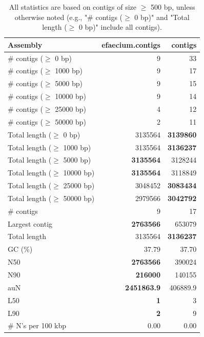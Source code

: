 \documentclass[12pt,a4paper]{article}
\begin{document}
\begin{table}[ht]
\begin{center}
\caption{All statistics are based on contigs of size $\geq$ 500 bp, unless otherwise noted (e.g., "\# contigs ($\geq$ 0 bp)" and "Total length ($\geq$ 0 bp)" include all contigs).}
\begin{tabular}{|l*{2}{|r}|}
\hline
Assembly & efaecium.contigs & contigs \\ \hline
\# contigs ($\geq$ 0 bp) & 9 & 33 \\ \hline
\# contigs ($\geq$ 1000 bp) & 9 & 17 \\ \hline
\# contigs ($\geq$ 5000 bp) & 9 & 15 \\ \hline
\# contigs ($\geq$ 10000 bp) & 9 & 14 \\ \hline
\# contigs ($\geq$ 25000 bp) & 4 & 12 \\ \hline
\# contigs ($\geq$ 50000 bp) & 2 & 11 \\ \hline
Total length ($\geq$ 0 bp) & 3135564 & {\bf 3139860} \\ \hline
Total length ($\geq$ 1000 bp) & 3135564 & {\bf 3136237} \\ \hline
Total length ($\geq$ 5000 bp) & {\bf 3135564} & 3128244 \\ \hline
Total length ($\geq$ 10000 bp) & {\bf 3135564} & 3118849 \\ \hline
Total length ($\geq$ 25000 bp) & 3048452 & {\bf 3083434} \\ \hline
Total length ($\geq$ 50000 bp) & 2979566 & {\bf 3042792} \\ \hline
\# contigs & 9 & 17 \\ \hline
Largest contig & {\bf 2763566} & 653079 \\ \hline
Total length & 3135564 & {\bf 3136237} \\ \hline
GC (\%) & 37.79 & 37.70 \\ \hline
N50 & {\bf 2763566} & 390024 \\ \hline
N90 & {\bf 216000} & 140155 \\ \hline
auN & {\bf 2451863.9} & 406889.9 \\ \hline
L50 & {\bf 1} & 3 \\ \hline
L90 & {\bf 2} & 9 \\ \hline
\# N's per 100 kbp & 0.00 & 0.00 \\ \hline
\end{tabular}
\end{center}
\end{table}
\end{document}
